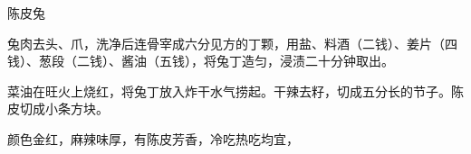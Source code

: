 \begin{recipe}{陈皮兔}

\ingredients


\cooking

\step 兔肉去头、爪，洗净后连骨宰成六分见方的丁颗，用盐、料酒（二钱）、姜片（四
钱）、葱段（二钱）、酱油（五钱），将兔丁造匀，浸渍二十分钟取出。

\step 菜油在旺火上烧红，将兔丁放入炸干水气捞起。干辣去籽，切成五分长的节子。陈
皮切成小条方块。

\notes

颜色金红，麻辣味厚，有陈皮芳香，冷吃热吃均宜，

\end{recipe}

